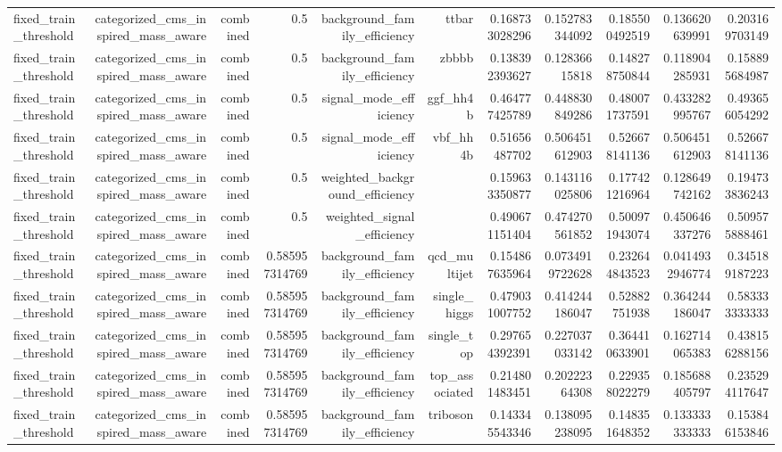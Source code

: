\begin{table}[htbp]
{\begin{tabular}{lrrrrrrrrrr}
fixed\_train\_threshold & categorized\_cms\_inspired\_mass\_aware & combined & 0.5 & background\_family\_efficiency & ttbar & 0.168733028296 & 0.152783344092 & 0.185500492519 & 0.136620639991 & 0.203169703149 \\
fixed\_train\_threshold & categorized\_cms\_inspired\_mass\_aware & combined & 0.5 & background\_family\_efficiency & zbbbb & 0.138392393627 & 0.12836615818 & 0.148278750844 & 0.118904285931 & 0.158895684987 \\
fixed\_train\_threshold & categorized\_cms\_inspired\_mass\_aware & combined & 0.5 & signal\_mode\_efficiency & ggf\_hh4b & 0.464777425789 & 0.448830849286 & 0.480071737591 & 0.433282995767 & 0.493656054292 \\
fixed\_train\_threshold & categorized\_cms\_inspired\_mass\_aware & combined & 0.5 & signal\_mode\_efficiency & vbf\_hh4b & 0.51656487702 & 0.506451612903 & 0.526678141136 & 0.506451612903 & 0.526678141136 \\
fixed\_train\_threshold & categorized\_cms\_inspired\_mass\_aware & combined & 0.5 & weighted\_background\_efficiency &  & 0.159633350877 & 0.143116025806 & 0.177421216964 & 0.128649742162 & 0.194733836243 \\
fixed\_train\_threshold & categorized\_cms\_inspired\_mass\_aware & combined & 0.5 & weighted\_signal\_efficiency &  & 0.490671151404 & 0.474270561852 & 0.500971943074 & 0.450646337276 & 0.509575888461 \\
fixed\_train\_threshold & categorized\_cms\_inspired\_mass\_aware & combined & 0.585957314769 & background\_family\_efficiency & qcd\_multijet & 0.154867635964 & 0.0734919722628 & 0.232644843523 & 0.0414932946774 & 0.345189187223 \\
fixed\_train\_threshold & categorized\_cms\_inspired\_mass\_aware & combined & 0.585957314769 & background\_family\_efficiency & single\_higgs & 0.479031007752 & 0.414244186047 & 0.52882751938 & 0.364244186047 & 0.583333333333 \\
fixed\_train\_threshold & categorized\_cms\_inspired\_mass\_aware & combined & 0.585957314769 & background\_family\_efficiency & single\_top & 0.297654392391 & 0.227037033142 & 0.364410633901 & 0.162714065383 & 0.438156288156 \\
fixed\_train\_threshold & categorized\_cms\_inspired\_mass\_aware & combined & 0.585957314769 & background\_family\_efficiency & top\_associated & 0.214801483451 & 0.20222364308 & 0.229358022279 & 0.185688405797 & 0.235294117647 \\
fixed\_train\_threshold & categorized\_cms\_inspired\_mass\_aware & combined & 0.585957314769 & background\_family\_efficiency & triboson & 0.143345543346 & 0.138095238095 & 0.148351648352 & 0.133333333333 & 0.153846153846 \\

\end{tabular}}
\end{table}
